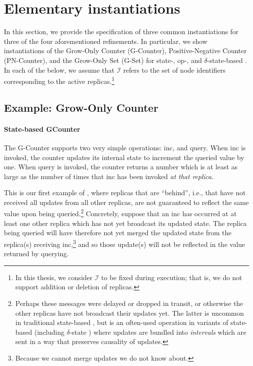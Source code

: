 \section{Elementary \CRDT instantiations}
In this section, we provide the specification of three common \CRDT instantiations
for three of the four aforementioned \CRDT refinements. In particular, we show
instantiations of the Grow-Only Counter (G-Counter), Positive-Negative Counter
(PN-Counter), and the Grow-Only Set (G-Set) for state-, op-, and
$\delta$-state-based \CRDTs. In each of the below, we assume that $\mathcal{I}$
refers to the set of node identifiers corresponding to the active
replicas.\footnote{In this thesis, we consider $\mathcal{I}$ to be fixed during
execution; that is, we do not support addition or deletion of replicas.}

\subsection{Example: Grow-Only Counter}
\label{sec:example-gcounter}

\paragraph{State-based GCounter}
The G-Counter supports two very simple operations: \textsf{inc}, and query. When
\textsf{inc} is invoked, the counter updates its internal state to increment the
queried value by one. When query is invoked, the counter returns a number which
is at least as large as the number of times that \textsf{inc} has been invoked
\textit{at that replica}.

This is our first example of \SEC, where replicas that are ``behind'', i.e.,
that have not received all updates from all other replicas, are not guaranteed
to reflect the same value upon being queried.\footnote{Perhaps these messages
were delayed or dropped in transit, or otherwise the other replicas have not
broadcast their updates yet. The latter is uncommon in traditional state-based
\CRDTs, but is an often-used operation in variants of state-based \CRDTs
(including $\delta$-state \CRDTs) where updates are bundled into
\emph{intervals} which are sent in a way that preserves causality of updates.}
Concretely, suppose that an \textsf{inc} has occurred at at least one other
replica which has not yet broadcast its updated state. The replica being queried
will have therefore not yet merged the updated state from the replica(s)
receiving \textsf{inc},\footnote{Because we cannot merge updates we do not know
about.} and so those update(s) will not be reflected in the value returned by
querying.

